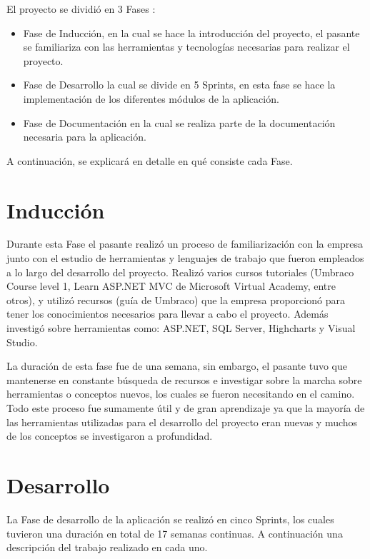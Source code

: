     El proyecto se dividió en 3 Fases :
\begin{itemize}
   \item Fase de Inducción, en la cual se hace la introducción del proyecto, el pasante se familiariza con las herramientas y tecnologías necesarias para realizar el proyecto.
   \item Fase de Desarrollo la cual se divide en 5 Sprints, en esta fase se hace la implementación de los diferentes módulos de la aplicación.
   \item Fase de Documentación en la cual se realiza parte de la documentación necesaria para la aplicación.
\end{itemize}
A continuación, se explicará en detalle en qué consiste cada Fase.

\section{Inducción}
Durante esta Fase el pasante realizó un proceso de familiarización con la empresa junto con el estudio de herramientas y lenguajes de trabajo que fueron empleados a lo largo del desarrollo del proyecto.
Realizó varios cursos tutoriales (Umbraco Course level 1, Learn ASP.NET MVC de Microsoft Virtual Academy, entre otros),  y utilizó recursos (guía de Umbraco) que la empresa proporcionó para tener los conocimientos necesarios para llevar a cabo el proyecto. Además investigó sobre herramientas como: ASP.NET, SQL Server, Highcharts y Visual Studio.

La duración de esta fase fue de una semana, sin embargo, el pasante tuvo que mantenerse en constante búsqueda de recursos e investigar sobre la marcha sobre herramientas o conceptos nuevos, los cuales se fueron necesitando en el camino. Todo este proceso fue sumamente útil y de gran aprendizaje ya que la mayoría de las herramientas utilizadas para el desarrollo del proyecto eran nuevas y muchos de los conceptos se investigaron a profundidad.

\section{Desarrollo}
La Fase de desarrollo de la aplicación se realizó en cinco Sprints, los cuales tuvieron una duración en total de 17 semanas continuas. A continuación una descripción del trabajo realizado en cada uno.

